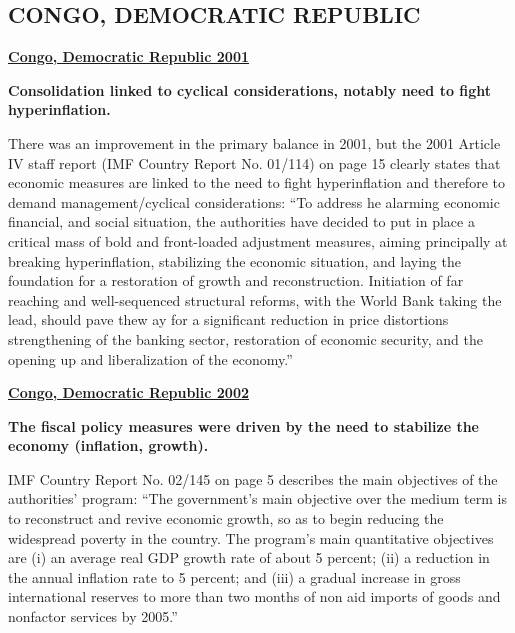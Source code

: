 \subsection[CONGO, DEMOCRATIC REPUBLIC]{CONGO, DEMOCRATIC REPUBLIC\protect\footnotemark}

\textbf{\underline{Congo, Democratic Republic 2001}}

\textbf{Consolidation linked to cyclical considerations, notably need to fight hyperinflation.} 

There was an improvement in the primary balance in 2001, but the 2001 Article IV staff report (IMF Country Report No. 01/114) on page 15 clearly states that economic measures are linked to the need to fight hyperinflation and therefore to demand management/cyclical considerations: “To address  he alarming economic financial, and social situation, the authorities have decided to put in place a critical mass of bold and front-loaded adjustment measures, aiming principally at breaking hyperinflation, stabilizing the economic situation, and laying the foundation for a restoration of growth and reconstruction. Initiation of far reaching and well-sequenced structural reforms, with the World Bank taking the lead, should pave thew ay for a significant reduction in price distortions strengthening of the banking sector, restoration of economic security, and the opening up and liberalization of the economy.”

\textbf{\underline{Congo, Democratic Republic 2002}}

\textbf{The fiscal policy measures were driven by the need to stabilize the economy (inflation, growth).}

IMF Country Report No. 02/145 on page 5 describes the main objectives of the authorities’ program: “The government's main objective over the medium term is to reconstruct and revive economic growth, so as to begin reducing the widespread poverty in the country. The program's main quantitative objectives are (i) an average real GDP growth rate of about 5 percent; (ii) a reduction in the annual inflation rate to 5 percent; and (iii) a gradual increase in gross international reserves to more than two months of non aid imports of goods and nonfactor services by 2005.” 

